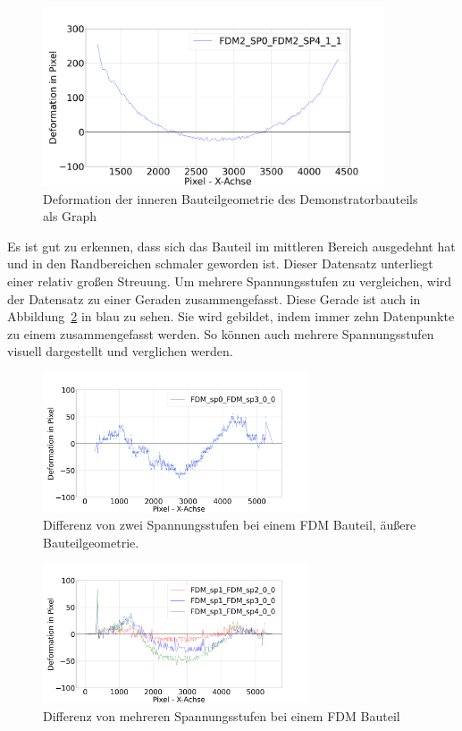 \begin{figure}[H]
    \centering
    \includegraphics[width=0.9\textwidth]{images/FDM_sp0_sp4_inner.png}
    \caption{Deformation der inneren Bauteilgeometrie 
    des Demonstratorbauteils als Graph}
    \label{fig:deformation_data_graph}
\end{figure}

Es ist gut zu erkennen, dass sich das Bauteil 
im mittleren Bereich ausgedehnt hat und in den Randbereichen schmaler geworden ist.
Dieser Datensatz unterliegt einer relativ großen Streuung. Um mehrere Spannungsstufen
zu vergleichen, wird der Datensatz zu einer Geraden zusammengefasst.
Diese Gerade ist auch in Abbildung~\ref{fig:deformation_data} in blau zu sehen. Sie wird 
gebildet, indem immer zehn Datenpunkte zu einem zusammengefasst werden. 
So können auch mehrere Spannungsstufen visuell dargestellt und verglichen werden.

\begin{figure}[H]
    \centering
    \includegraphics[width=0.7\textwidth]{images/FDM_sp0_sp3_defo_plot.png}
    \caption{Differenz von zwei Spannungsstufen bei einem FDM Bauteil, äußere 
    Bauteilgeometrie.}
    \label{fig:deformation_data}
\end{figure}

\begin{figure}[H]
    \centering
    \includegraphics[width=0.7\textwidth]{images/FDM_sp0_many_defo_plot2.png}
    \caption{Differenz von mehreren Spannungsstufen bei einem FDM Bauteil}
    \label{fig:deformation_data_all}
\end{figure}



